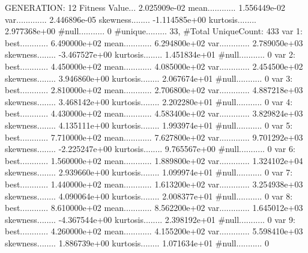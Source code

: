 \documentclass[oneside,letterpaper,titlepage]{article}
\begin{document}
\begin{Schunk}
\begin{Soutput}
GENERATION: 12
Fitness Value... 2.025909e-02
mean............ 1.556449e-02
var............. 2.446896e-05
skewness........ -1.114585e+00
kurtosis........ 2.977368e+00
#null........... 0
#unique......... 33, #Total UniqueCount: 433
var 1:
best............ 6.490000e+02
mean............ 6.294800e+02
var............. 2.789050e+03
skewness........ -3.467527e+00
kurtosis........ 1.451834e+01
#null........... 0
var 2:
best............ 4.450000e+02
mean............ 4.085000e+02
var............. 2.454500e+02
skewness........ 3.946860e+00
kurtosis........ 2.067674e+01
#null........... 0
var 3:
best............ 2.810000e+02
mean............ 2.706800e+02
var............. 4.887218e+03
skewness........ 3.468142e+00
kurtosis........ 2.202280e+01
#null........... 0
var 4:
best............ 4.430000e+02
mean............ 4.583400e+02
var............. 3.829824e+03
skewness........ 4.135111e+00
kurtosis........ 1.993974e+01
#null........... 0
var 5:
best............ 7.710000e+02
mean............ 7.627800e+02
var............. 9.701292e+03
skewness........ -2.225247e+00
kurtosis........ 9.765567e+00
#null........... 0
var 6:
best............ 1.560000e+02
mean............ 1.889800e+02
var............. 1.324102e+04
skewness........ 2.939660e+00
kurtosis........ 1.099974e+01
#null........... 0
var 7:
best............ 1.440000e+02
mean............ 1.613200e+02
var............. 3.254938e+03
skewness........ 4.090064e+00
kurtosis........ 2.008377e+01
#null........... 0
var 8:
best............ 8.610000e+02
mean............ 8.562200e+02
var............. 1.645012e+03
skewness........ -4.367544e+00
kurtosis........ 2.398192e+01
#null........... 0
var 9:
best............ 4.260000e+02
mean............ 4.155200e+02
var............. 5.598410e+03
skewness........ 1.886739e+00
kurtosis........ 1.071634e+01
#null........... 0


\end{Soutput}
\end{Schunk}
\end{document}
